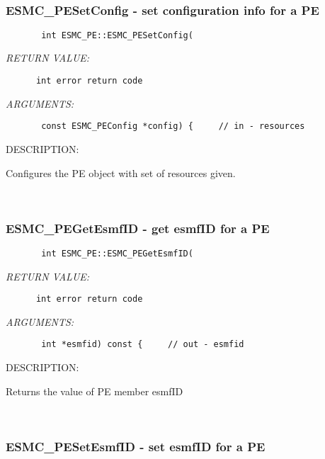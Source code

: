  
\mbox{}\hrulefill\ 
 
\subsubsection{ESMC\_PESetConfig - set configuration info for a PE}


  
\begin{verbatim}       int ESMC_PE::ESMC_PESetConfig(\end{verbatim}{\em RETURN VALUE:}
\begin{verbatim}      int error return code\end{verbatim}{\em ARGUMENTS:}
\begin{verbatim}       const ESMC_PEConfig *config) {     // in - resources\end{verbatim}
{\sf DESCRIPTION:\\ }


      Configures the PE object with set of resources given.
   
 
\mbox{}\hrulefill\ 
 
\subsubsection{ESMC\_PEGetEsmfID - get esmfID for a PE}


  
\begin{verbatim}       int ESMC_PE::ESMC_PEGetEsmfID(\end{verbatim}{\em RETURN VALUE:}
\begin{verbatim}      int error return code\end{verbatim}{\em ARGUMENTS:}
\begin{verbatim}       int *esmfid) const {     // out - esmfid\end{verbatim}
{\sf DESCRIPTION:\\ }


       Returns the value of PE member esmfID
   
 
\mbox{}\hrulefill\ 
 
\subsubsection{ESMC\_PESetEsmfID - set esmfID for a PE}


